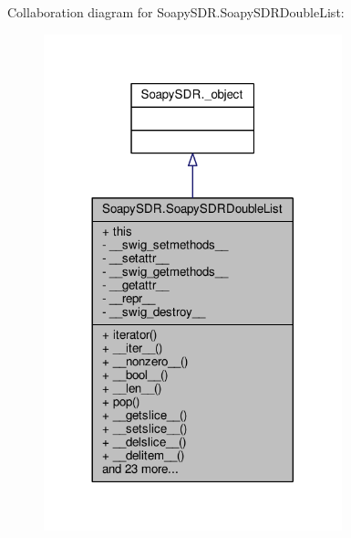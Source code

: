 Collaboration diagram for Soapy\+S\+D\+R.\+Soapy\+S\+D\+R\+Double\+List\+:
\nopagebreak
\begin{figure}[H]
\begin{center}
\leavevmode
\includegraphics[width=245pt]{d6/daf/classSoapySDR_1_1SoapySDRDoubleList__coll__graph}
\end{center}
\end{figure}
